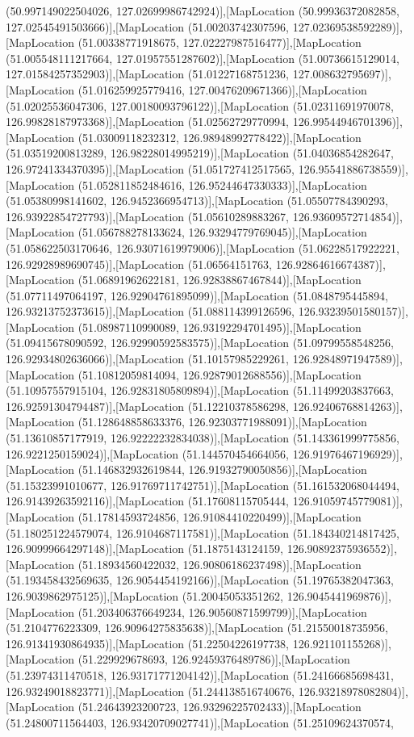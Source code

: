 (50.997149022504026, 127.02699986742924)],[MapLocation (50.99936372082858, 127.02545491503666)],[MapLocation (51.00203742307596, 127.02369538592289)],[MapLocation (51.00338771918675, 127.02227987516477)],[MapLocation (51.005548111217664, 127.01957551287602)],[MapLocation (51.00736615129014, 127.01584257352903)],[MapLocation (51.01227168751236, 127.008632795697)],[MapLocation (51.016259925779416, 127.00476209671366)],[MapLocation (51.02025536047306, 127.00180093796122)],[MapLocation (51.02311691970078, 126.99828187973368)],[MapLocation (51.02562729770994, 126.99544946701396)],[MapLocation (51.03009118232312, 126.98948992778422)],[MapLocation (51.03519200813289, 126.98228014995219)],[MapLocation (51.04036854282647, 126.97241334370395)],[MapLocation (51.051727412517565, 126.95541886738559)],[MapLocation (51.052811852484616, 126.95244647330333)],[MapLocation (51.05380998141602, 126.9452366954713)],[MapLocation (51.05507784390293, 126.93922854727793)],[MapLocation (51.05610289883267, 126.93609572714854)],[MapLocation (51.056788278133624, 126.93294779769045)],[MapLocation (51.058622503170646, 126.93071619979006)],[MapLocation (51.06228517922221, 126.92928989690745)],[MapLocation (51.06564151763, 126.92864616674387)],[MapLocation (51.06891962622181, 126.92838867467844)],[MapLocation (51.07711497064197, 126.92904761895099)],[MapLocation (51.0848795445894, 126.93213752373615)],[MapLocation (51.088114399126596, 126.93239501580157)],[MapLocation (51.08987110990089, 126.93192294701495)],[MapLocation (51.09415678090592, 126.92990592583575)],[MapLocation (51.09799558548256, 126.92934802636066)],[MapLocation (51.10157985229261, 126.92848971947589)],[MapLocation (51.10812059814094, 126.92879012688556)],[MapLocation (51.10957557915104, 126.92831805809894)],[MapLocation (51.11499203837663, 126.92591304794487)],[MapLocation (51.12210378586298, 126.92406768814263)],[MapLocation (51.128648858633376, 126.92303771988091)],[MapLocation (51.13610857177919, 126.92222232834038)],[MapLocation (51.143361999775856, 126.9221250159024)],[MapLocation (51.144570454664056, 126.91976467196929)],[MapLocation (51.146832932619844, 126.91932790050856)],[MapLocation (51.15323991010677, 126.91769711742751)],[MapLocation (51.161532068044494, 126.91439263592116)],[MapLocation (51.17608115705444, 126.91059745779081)],[MapLocation (51.17814593724856, 126.91084410220499)],[MapLocation (51.180251224579074, 126.9104687117581)],[MapLocation (51.184340214817425, 126.90999664297148)],[MapLocation (51.1875143124159, 126.90892375936552)],[MapLocation (51.18934560422032, 126.90806186237498)],[MapLocation (51.193458432569635, 126.9054454192166)],[MapLocation (51.19765382047363, 126.9039862975125)],[MapLocation (51.20045053351262, 126.9045441969876)],[MapLocation (51.203406376649234, 126.90560871599799)],[MapLocation (51.2104776223309, 126.90964275835638)],[MapLocation (51.21550018735956, 126.91341930864935)],[MapLocation (51.22504226197738, 126.921101155268)],[MapLocation (51.229929678693, 126.92459376489786)],[MapLocation (51.23974311470518, 126.93171771204142)],[MapLocation (51.24166685698431, 126.93249018823771)],[MapLocation (51.244138516740676, 126.93218978082804)],[MapLocation (51.24643923200723, 126.93296225702433)],[MapLocation (51.24800711564403, 126.93420709027741)],[MapLocation (51.25109624370574, 